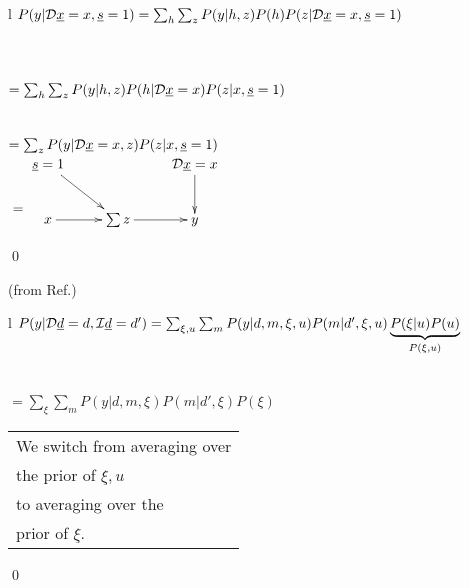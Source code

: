 \begin{longtable}{l}
\color{red}
$P(y|{\cal D}{\underline{x}}=x, {\underline{s}}=1)=
\sum_h
\sum_z P(y|h, z)P(h)
P(z|{\cal D}{\underline{x}}=x, {\underline{s}}=1)$
\\
\\
\\
\\
\color{red}
$=\sum_h\sum_z P(y|h,z)P(h|{\cal D}{\underline{x}}=x)
P(z|x, {\underline{s}}=1)$
\\
\\
\xymatrix{\\=}
\\
\color{red}
$=\sum_z P(y|{\cal D}{\underline{x}}=x, z)P(z|x, {\underline{s}}=1)$
\\
$\xymatrix{\\=}\xymatrix{
\rvs=1\ar[rd]
&&\cald\rvx=x\ar[d]
\\
x\ar[r]
&\sum z\ar[r]
&y
}$
\end{longtable}
\qed

\begin{claim}(from Ref.\cite{pearl-2019review})
\label{cl-mediation-plus}
\decMediation
\end{claim}
\proof
\begin{longtable}{l}
\color{red}
$P(y|{\cal D}{\underline{d}}=d,{\cal I}{\underline{d}}=d')=
\sum_{\xi, u}
\sum_{m}
P(y|d,m,\xi, u)P(m|d', \xi, u)
\underbrace{P(\xi|u)P(u)}_{P(\xi, u)}$
\\
\\
\\
\color{red}
$=
\sum_{\xi}
\sum_{m}
P(y|d,m,\xi)P(m|d', \xi)
P(\xi)$
\\
\xymatrix{\\=}
\begin{tabular}{l}
We switch from averaging over\\ the
prior of $\xi, u$\\
to averaging over the\\
prior of $\xi$.
\end{tabular}
\end{longtable}
\qed



%
